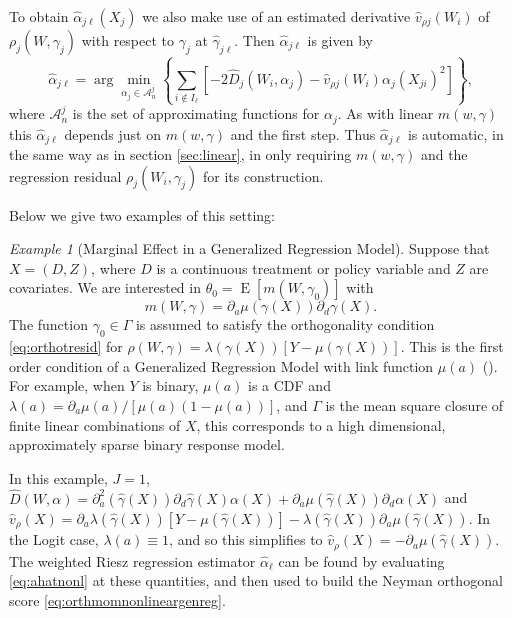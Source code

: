 \documentclass[aos]{imsart}
\numberwithin{equation}{section}
\theoremstyle{plain}
\theoremstyle{remark}
\newtheorem{example}{Example}
\DeclareMathOperator{\E}{E}
\begin{document}
To obtain $\hat{\alpha}_{j\ell}(X_{j})$ we also make use of an estimated derivative $\hat{v}_{\rho j}(W_{i})$ of $\rho_{j}(W,\gamma_{j})$ with respect to $\gamma_{j}$ at $\hat{\gamma}_{j\ell}.$ Then $\hat{\alpha}_{j\ell}$ is
given by
\begin{equation}
 \hat{\alpha}_{j\ell}= \arg\min_{\alpha_{j}\mathcal{\in A}^{j}_n}\left\{  \sum_{i\notin I_{\ell}}[-2\hat{D}_{j}%
(W_{i},\alpha_{j})-\hat{v}_{\rho j}(W_{i})\alpha_{j}(X_{ji})^{2}]\right\}
,   \label{eq:ahatnonl}
\end{equation}
where $\mathcal{A}^{j}_n$ is the set of approximating functions for $\alpha_{j}.$ As with linear $m(w, \gamma)$ this $\hat{\alpha}_{j\ell}$ depends just on $m(w,\gamma)$ and the first step. Thus $\hat{\alpha}_{j\ell}$ is automatic, in the same way as in section \ref{sec:linear}, in only requiring $m(w,\gamma)$ and the regression residual $\rho_{j}(W_{i},\gamma_{j})$ for its construction.

Below we give two examples of this setting:

\begin{example}[Marginal Effect in a Generalized Regression Model]
    Suppose that $X = (D,Z)$, where $D$ is a continuous treatment or policy variable and $Z$ are covariates. We are interested in $\theta_0 = \E[m(W, \gamma_0)]$ with $$m(W, \gamma) = \partial_a \mu (\gamma(X)) \partial_d \gamma(X).$$ The function $\gamma_0 \in \Gamma$ is assumed to satisfy the orthogonality condition \eqref{eq:orthotresid} for $\rho(W,\gamma)=\lambda(\gamma(X))[Y-\mu(\gamma(X))]$. This is the first order condition of a Generalized Regression Model with link function $\mu(a)$ (\cite{nelder1972generalized}). For example, when $Y$ is binary, $\mu(a)$ is a CDF and $\lambda(a) = \partial_a\mu(a)/[\mu(a)(1-\mu(a))]$, and $\Gamma$ is the mean square closure of finite linear combinations of $X$, this corresponds to a high dimensional, approximately sparse binary response model.

    In this example, $J = 1$, $\hat D(W, \alpha) = \partial_a^2(\hat\gamma(X))\partial_d \hat\gamma(X) \alpha(X) + \partial_a \mu(\hat\gamma(X))\partial_d \alpha (X)$ and $\hat v_\rho(X) = \partial_a\lambda(\hat\gamma(X))[Y - \mu(\hat\gamma(X))] - \lambda(\hat\gamma(X))\partial_a\mu(\hat\gamma(X))$. In the Logit case, $\lambda(a) \equiv 1$, and so this simplifies to $\hat v_\rho(X) = -\partial_a\mu(\hat\gamma(X))$. The weighted Riesz regression estimator  $\hat\alpha_\ell$ can be found by evaluating \eqref{eq:ahatnonl} at these quantities, and then used to build the Neyman orthogonal score \eqref{eq:orthmomnonlineargenreg}.
\end{example}
\end{document}
